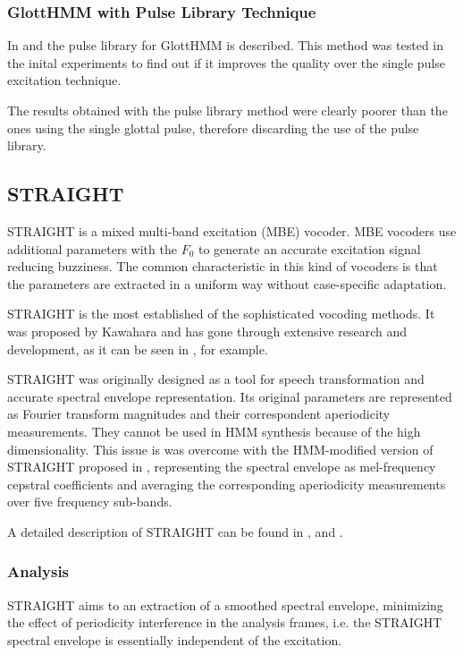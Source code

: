 \subsubsection{GlottHMM with Pulse Library Technique}
\label{vocoders_glott_pulse_library}
In \cite{TuomoMSc} and \cite{manuMSc} the pulse library for GlottHMM is described.
%
This method was tested in the inital experiments to find out if it improves the quality over the single pulse excitation technique.

The results obtained with the pulse library method were clearly poorer than the ones using the single glottal pulse, therefore discarding the use of the pulse library.

\subsection{STRAIGHT}
\label{vocoders_straight}
STRAIGHT is a mixed multi-band excitation (MBE) vocoder.
%
MBE vocoders use additional parameters with the $F_{0}$ to generate an accurate excitation signal reducing buzziness.
%
The common characteristic in this kind of vocoders is that the parameters are extracted in a uniform way without case-specific adaptation.

STRAIGHT is the most established of the sophisticated vocoding methods.
%
It was proposed by Kawahara \cite{kawahara1997speech} and has gone through extensive research and development, as it can be seen in \cite{kawahara1999restructuring}, for example.

STRAIGHT was originally designed as a tool for speech transformation and accurate spectral envelope representation.
%
Its original parameters are represented as Fourier transform magnitudes and their correspondent aperiodicity measurements.
%
They cannot be used in HMM synthesis because of the high dimensionality. 
%
This issue is was overcome with the HMM-modified version of STRAIGHT proposed in \cite{heiga2007details}, representing the spectral envelope as mel-frequency cepstral coefficients and averaging the corresponding aperiodicity measurements over five frequency sub-bands.

A detailed description of STRAIGHT can be found in \cite{kawahara1997speech}, \cite{heiga2007details} and \cite{manuMSc}.

\subsubsection{Analysis}
\label{vocoders_straight_analysis}
STRAIGHT aims to an extraction of a smoothed spectral envelope, minimizing the effect of periodicity interference in the analysis frames, i.e. the STRAIGHT spectral envelope is essentially independent of the excitation.

